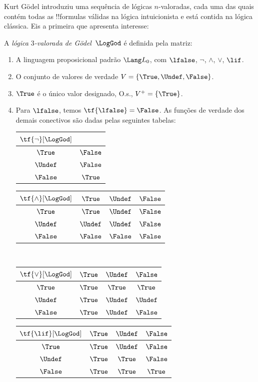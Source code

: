 \documentclass[../../../include/open-logic-section]{subfiles}
\begin{document}


Kurt G\"odel introduziu uma sequência de lógicas $n$-valoradas, cada uma das quais
contém todas as !!{formula}s válidas na lógica intuicionista e está
contida na lógica clássica. Eis a primeira que apresenta interesse:

\begin{defn}
A \emph{lógica $3$-valorada de G\"odel}~$\LogGod$ é definida pela matriz:
\begin{enumerate}
  \item A linguagem proposicional padrão $\Lang L_0$, com
  $\lfalse$, $\lnot$, $\land$, $\lor$, $\lif$.
  \item O conjunto de valores de verdade $V = \{\True, \Undef, \False\}$.
  \item $\True$ é o único valor designado, O.s.\@, $V^+ = \{\True\}$.
  \item Para $\lfalse$, temos $\tf{\lfalse} = \False$. As funções de
  verdade dos demais conectivos são dadas pelas seguintes
  tabelas:
  \begin{center}
    \begin{tabular}{c|c} 
      $\tf{\lnot}[\LogGod]$ & \\ 
      \hline  
      $\True$ & $\False$ \\ 
      $\Undef$ & $\False$ \\
      $\False$ & $\True$ 
    \end{tabular}
    \quad
    \begin{tabular}{c|ccc} 
      $\tf{\land}[\LogGod]$ & $\True$ & $\Undef$ & $\False$ \\ 
      \hline 
      $\True$ & $\True$ & $\Undef$ & $\False$ \\ 
      $\Undef$ & $\Undef$ & $\Undef$ & $\False$\\ 
      $\False$ & $\False$ & $\False$ & $\False$ 
    \end{tabular}
    \\[2ex]
    \begin{tabular}{c|ccc} 
      $\tf{\lor}[\LogGod]$ & $\True$ & $\Undef$ & $\False$ \\ 
      \hline 
      $\True$ & $\True$ & $\True$ & $\True$ \\ 
      $\Undef$ & $\True$ & $\Undef$ & $\Undef$ \\
      $\False$ & $\True$ & $\Undef$ & $\False$ 
    \end{tabular}
    \quad
    \begin{tabular}{c|ccc} 
      $\tf{\lif}[\LogGod]$ & $\True$ & $\Undef$ & $\False$ \\ 
      \hline 
      $\True$ & $\True$ & $\Undef$ & $\False$ \\ 
      $\Undef$ & $\True$ & $\True$ & $\False$  \\ 
      $\False$ & $\True$ & $\True$ & $\True$ 
    \end{tabular}
  \end{center} 
\end{enumerate}
\end{defn}
\end{document}
